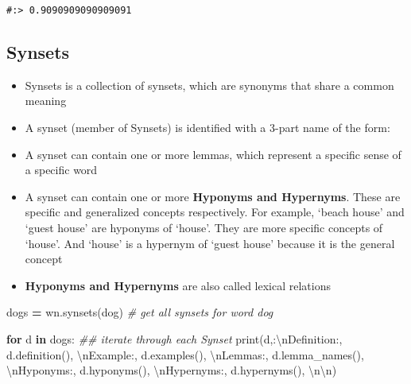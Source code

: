 \documentclass[
]{book}
\newenvironment{Shaded}{\begin{snugshade}}{\end{snugshade}}
\newcommand{\BuiltInTok}[1]{#1}
\newcommand{\CharTok}[1]{\textcolor[rgb]{0.5,0.5,0.5}{#1}}
\newcommand{\CommentTok}[1]{\textcolor[rgb]{0.37,0.37,0.37}{\textit{#1}}}
\newcommand{\ControlFlowTok}[1]{\textcolor[rgb]{0.27,0.27,0.27}{\textbf{#1}}}
\newcommand{\KeywordTok}[1]{\textcolor[rgb]{0.27,0.27,0.27}{\textbf{#1}}}
\newcommand{\NormalTok}[1]{#1}
\newcommand{\OperatorTok}[1]{\textcolor[rgb]{0.43,0.43,0.43}{\textbf{#1}}}
\newcommand{\StringTok}[1]{\textcolor[rgb]{0.5,0.5,0.5}{#1}}
\providecommand{\tightlist}{%
  \setlength{\itemsep}{0pt}\setlength{\parskip}{0pt}}
\begin{document}
\begin{verbatim}
#:> 0.9090909090909091
\end{verbatim}

\hypertarget{synsets}{%
\subsection{Synsets}\label{synsets}}

\begin{itemize}
\tightlist
\item
  Synsets is a collection of synsets, which are synonyms that share a common meaning\\
\item
  A synset (member of Synsets) is identified with a 3-part name of the form:
\item
  A synset can contain one or more lemmas, which represent a specific sense of a specific word\\
\item
  A synset can contain one or more \textbf{Hyponyms and Hypernyms}. These are specific and generalized concepts respectively. For example, `beach house' and `guest house' are hyponyms of `house'. They are more specific concepts of `house'. And `house' is a hypernym of `guest house' because it is the general concept\\
\item
  \textbf{Hyponyms and Hypernyms} are also called lexical relations
\end{itemize}

\begin{Shaded}
\begin{Highlighting}[]
\NormalTok{dogs }\OperatorTok{=}\NormalTok{ wn.synsets(}\StringTok{\textquotesingle{}dog\textquotesingle{}}\NormalTok{) }\CommentTok{\# get all synsets for word \textquotesingle{}dog\textquotesingle{}}

\ControlFlowTok{for}\NormalTok{ d }\KeywordTok{in}\NormalTok{ dogs:  }\CommentTok{\#\# iterate through each Synset}
  \BuiltInTok{print}\NormalTok{(d,}\StringTok{\textquotesingle{}:}\CharTok{\textbackslash{}n}\StringTok{Definition:\textquotesingle{}}\NormalTok{, d.definition(),}
           \StringTok{\textquotesingle{}}\CharTok{\textbackslash{}n}\StringTok{Example:\textquotesingle{}}\NormalTok{,    d.examples(),}
           \StringTok{\textquotesingle{}}\CharTok{\textbackslash{}n}\StringTok{Lemmas:\textquotesingle{}}\NormalTok{,     d.lemma\_names(),}
           \StringTok{\textquotesingle{}}\CharTok{\textbackslash{}n}\StringTok{Hyponyms:\textquotesingle{}}\NormalTok{,   d.hyponyms(), }
           \StringTok{\textquotesingle{}}\CharTok{\textbackslash{}n}\StringTok{Hypernyms:\textquotesingle{}}\NormalTok{,  d.hypernyms(), }\StringTok{\textquotesingle{}}\CharTok{\textbackslash{}n\textbackslash{}n}\StringTok{\textquotesingle{}}\NormalTok{)}
\end{Highlighting}
\end{Shaded}
\end{document}
